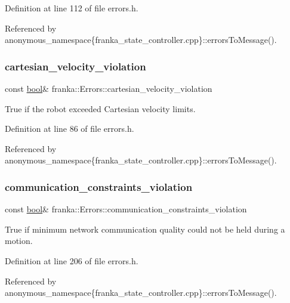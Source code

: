 Definition at line 112 of file errors.\+h.



Referenced by anonymous\+\_\+namespace\{franka\+\_\+state\+\_\+controller.\+cpp\}\+::errors\+To\+Message().

\mbox{\label{structfranka_1_1Errors_a382fbec6b463ddcc2cbfd90340021ff1}} 
\subsubsection{\texorpdfstring{cartesian\+\_\+velocity\+\_\+violation}{cartesian\_velocity\_violation}}
{\footnotesize\ttfamily const \hyperlink{classbool}{bool}\& franka\+::\+Errors\+::cartesian\+\_\+velocity\+\_\+violation}

True if the robot exceeded Cartesian velocity limits. 

Definition at line 86 of file errors.\+h.



Referenced by anonymous\+\_\+namespace\{franka\+\_\+state\+\_\+controller.\+cpp\}\+::errors\+To\+Message().

\mbox{\label{structfranka_1_1Errors_a4d17af86c1ebb698c218796fa15f9bd7}} 
\subsubsection{\texorpdfstring{communication\+\_\+constraints\+\_\+violation}{communication\_constraints\_violation}}
{\footnotesize\ttfamily const \hyperlink{classbool}{bool}\& franka\+::\+Errors\+::communication\+\_\+constraints\+\_\+violation}

True if minimum network communication quality could not be held during a motion. 

Definition at line 206 of file errors.\+h.



Referenced by anonymous\+\_\+namespace\{franka\+\_\+state\+\_\+controller.\+cpp\}\+::errors\+To\+Message().

